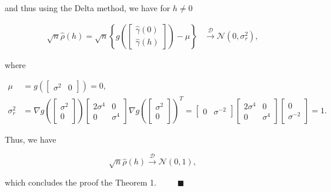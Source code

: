 \documentclass[]{book}
\theoremstyle{definition}
\theoremstyle{definition}
\theoremstyle{definition}
\theoremstyle{remark}
\begin{document}
{and thus using the Delta method, we have for \(h \neq 0\)

\[
\begin{aligned}
    \sqrt{n}\hat{\rho}(h) =
    \sqrt{n}\left\{g\left(
        \begin{bmatrix}
         \hat{\gamma} \left( 0 \right) \\
         \hat{\gamma} \left( h \right)
        \end{bmatrix} \right)
    - {\mu} \right\}
    &\overset{\mathcal{D}}{\to} 
    \mathcal{N}\left(0, \sigma_r^2 \right),
    \end{aligned}
\]

where

\[
\begin{aligned}
{\mu} &= g\left(\begin{bmatrix}
         \sigma^2 & 0
        \end{bmatrix} \right) = 0,\\
\sigma_r^2 &= \nabla g\left(\begin{bmatrix}
         \sigma^2 \\
         0
        \end{bmatrix} \right) \begin{bmatrix}
         2\sigma^4 & 0\\
         0 & \sigma^4
        \end{bmatrix} \nabla g\left(\begin{bmatrix}
         \sigma^2 \\
         0
        \end{bmatrix} \right)^{T}
         = \begin{bmatrix}
         0 & \sigma^{-2}
        \end{bmatrix}  \begin{bmatrix}
         2\sigma^4 & 0\\
         0 & \sigma^4
        \end{bmatrix} \begin{bmatrix}
         0 \\
         \sigma^{-2}
        \end{bmatrix} = 1.
    \end{aligned}
\]

Thus, we have

\[
\sqrt{n}\hat{\rho}(h) \overset{\mathcal{D}}{\to} 
    \mathcal{N}\left(0, 1 \right),
\]

which concludes the proof the Theorem 1.
\(\;\;\;\;\;\;\;\; \blacksquare\)

\hypertarget{appendixb}{%
}}
\end{document}
